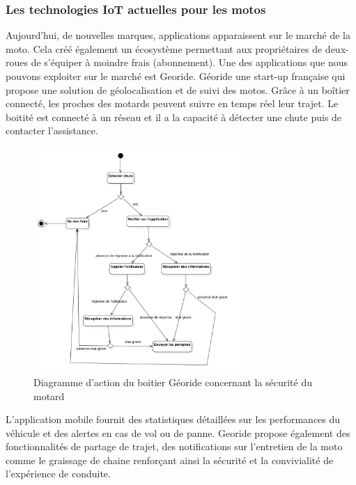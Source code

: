 \subsubsection{Les technologies IoT actuelles pour les motos}
Aujourd'hui, de nouvelles marques, applications\cite{iot_accessoire_moto} apparaissent sur le marché de la moto. Cela créé également un écosystème permettant aux propriétaires de deux-roues de s'équiper à moindre frais (abonnement). Une des applications que nous pouvons exploiter sur le marché est Georide. Géoride une start-up française qui propose une solution de géolocalisation et de suivi des motos. Grâce à un boîtier connecté, les proches des motards peuvent suivre en temps réel leur trajet. Le boitité est connecté à un réseau et il a la capacité à détecter une chute puis de contacter l'assistance. 
\begin{figure}[H]
    \centering
    \includegraphics[width=0.7\textwidth]{images/diag_etat_georide.png} 
    \caption{Diagramme d'action du boitier Géoride concernant la sécurité du motard}
\end{figure}
L’application mobile fournit des statistiques détaillées sur les performances du véhicule et des alertes en cas de vol ou de panne. Georide propose également des fonctionnalités de partage de trajet, des notifications sur l'entretien de la moto comme le graissage de chaine renforçant ainsi la sécurité et la convivialité de l’expérience de conduite.
